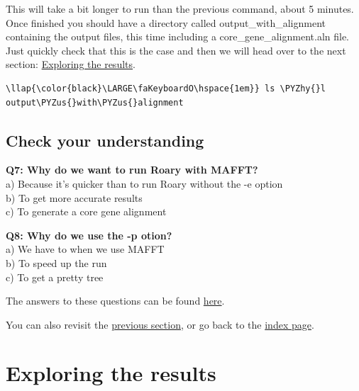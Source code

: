 \documentclass[11pt]{article}
\def\PYZus{\char`\_}
\def\PYZhy{\char`\-}
\begin{document}
    This will take a bit longer to run than the previous command, about 5
minutes. Once finished you should have a directory called
output\_with\_alignment containing the output files, this time including
a core\_gene\_alignment.aln file. Just quickly check that this is the
case and then we will head over to the next section:
\href{results.ipynb}{Exploring the results}.

\begin{terminalinput}
\begin{Verbatim}[commandchars=\\\{\}]
\llap{\color{black}\LARGE\faKeyboardO\hspace{1em}} ls \PYZhy{}l output\PYZus{}with\PYZus{}alignment
\end{Verbatim}
\end{terminalinput}

    \hypertarget{check-your-understanding}{%
\subsection{Check your understanding}\label{check-your-understanding}}

\textbf{Q7: Why do we want to run Roary with MAFFT?}\\
a) Because it's quicker than to run Roary without the -e option\\
b) To get more accurate results\\
c) To generate a core gene alignment

\textbf{Q8: Why do we use the -p otion?}\\
a) We have to when we use MAFFT\\
b) To speed up the run\\
c) To get a pretty tree

The answers to these questions can be found \href{answers.ipynb}{here}.

You can also revisit the \href{qc.ipynb}{previous section}, or go back
to the \href{index.ipynb}{index page}.





\newpage






    \hypertarget{exploring-the-results}{%
\section{Exploring the results}\label{exploring-the-results}}
\end{document}
